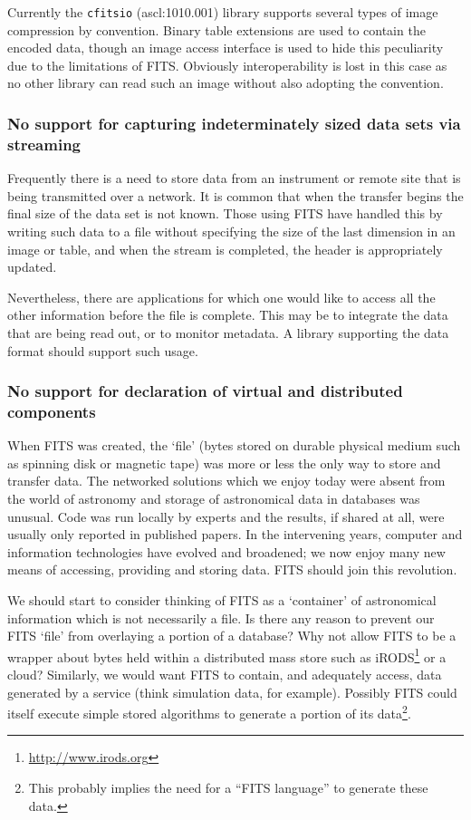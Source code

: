 \documentclass[final,authoryear,5p,times,twocolumn]{elsarticle}
\begin{document}
Currently the \texttt{cfitsio} (ascl:1010.001) library supports
several types of image compression by convention.  Binary table
extensions are used to contain the encoded data, though an image
access interface is used to hide this peculiarity due to the
limitations of FITS. Obviously interoperability is lost in this case
as no other library can read such an image without also adopting the
convention.

\subsubsection{No support for capturing indeterminately sized data sets via streaming}


Frequently there is a need to store data from an instrument or remote
site that is being transmitted over a network. It is common that when
the transfer begins the final size of the data set is not known. Those
using FITS have handled this by writing such data to a file without
specifying the size of the last dimension in an image or table, and
when the stream is completed, the header is appropriately updated.


Nevertheless, there are applications for which one would like to
access all the other information before the file is complete. This may
be to integrate the data that are being read out, or to monitor
metadata. A library supporting the data format should support such
usage.


\subsubsection{No support for declaration of virtual and distributed components}


When FITS was created, the `file' (bytes stored on durable physical
medium such as spinning disk or magnetic tape) was more or less the
only way to store and transfer data. The networked solutions which we
enjoy today were absent from the world of astronomy and storage of
astronomical data in databases was unusual. Code was run locally by
experts and the results, if shared at all, were usually only reported
in published papers. In the intervening years, computer and
information technologies have evolved and broadened; we now enjoy many
new means of accessing, providing and storing data. FITS should join
this revolution.


We should start to consider thinking of FITS as a `container' of
astronomical information which is not necessarily a file. Is there
any reason to prevent our FITS `file' from overlaying a portion of a
database? Why not allow FITS to be a wrapper about bytes held within a
distributed mass store such as
iRODS\footnote{\url{http://www.irods.org}} \citep[see e.g.][]{2007AGUFMIN13B1214R}
or a cloud? Similarly, we would
want FITS to contain, and adequately access, data generated by a
service (think simulation data, for example). Possibly FITS could
itself execute simple stored algorithms to generate a portion of its
data\footnote{This probably implies the need for a ``FITS language'' to generate these data.}.
\end{document}
